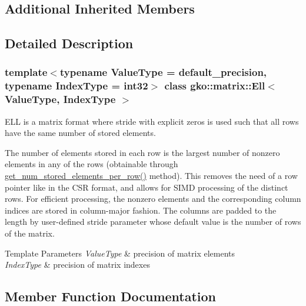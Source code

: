 \subsection*{Additional Inherited Members}


\subsection{Detailed Description}
\subsubsection*{template$<$typename Value\+Type = default\+\_\+precision, typename Index\+Type = int32$>$\newline
class gko\+::matrix\+::\+Ell$<$ Value\+Type, Index\+Type $>$}

E\+LL is a matrix format where stride with explicit zeros is used such that all rows have the same number of stored elements. 

The number of elements stored in each row is the largest number of nonzero elements in any of the rows (obtainable through \hyperlink{classgko_1_1matrix_1_1Ell_a08f9b04b356e58ab57d03ce335ff11ce}{get\+\_\+num\+\_\+stored\+\_\+elements\+\_\+per\+\_\+row()} method). This removes the need of a row pointer like in the C\+SR format, and allows for S\+I\+MD processing of the distinct rows. For efficient processing, the nonzero elements and the corresponding column indices are stored in column-\/major fashion. The columns are padded to the length by user-\/defined stride parameter whose default value is the number of rows of the matrix.


\begin{DoxyTemplParams}{Template Parameters}
{\em Value\+Type} & precision of matrix elements \\
\hline
{\em Index\+Type} & precision of matrix indexes \\
\hline
\end{DoxyTemplParams}


\subsection{Member Function Documentation}
\mbox{\label{classgko_1_1matrix_1_1Ell_a1ef17227a6de85a1c12ebc106abbfc32}} 

